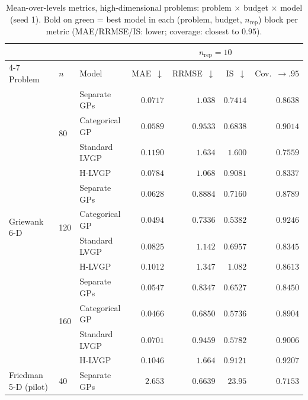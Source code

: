 \begin{table}[htbp]
\centering
\small
\setlength{\tabcolsep}{3.5pt}
\setlength{\fboxsep}{1.5pt}
\caption{Mean-over-levels metrics, high-dimensional problems: problem $\times$ budget $\times$ model (seed 1). Bold on green = best model in each (problem, budget, $n_{\mathrm{rep}}$) block per metric (MAE/RRMSE/IS: lower; coverage: closest to $0.95$).}
\label{tab:summary_hd}
\begin{tabular}{lllrrrr}
\toprule
 & & & \multicolumn{4}{c}{$n_{\mathrm{rep}}=10$} \\
\cmidrule(lr){4-7}
Problem & $n$ & Model & MAE~$\downarrow$ & RRMSE~$\downarrow$ & IS~$\downarrow$ & Cov.~$\to.95$ \\
\midrule
\multirow{12}{*}{Griewank 6-D} & \multirow{4}{*}{80} & Separate GPs & $0.0717$ & $1.038$ & $0.7414$ & $0.8638$ \\
 &  & Categorical GP & \colorbox{green!20}{\boldmath$0.0589$} & \colorbox{green!20}{\boldmath$0.9533$} & \colorbox{green!20}{\boldmath$0.6838$} & \colorbox{green!20}{\boldmath$0.9014$} \\
 &  & Standard LVGP & $0.1190$ & $1.634$ & $1.600$ & $0.7559$ \\
 &  & H-LVGP & $0.0784$ & $1.068$ & $0.9081$ & $0.8337$ \\
\cmidrule(lr){2-7}
 & \multirow{4}{*}{120} & Separate GPs & $0.0628$ & $0.8884$ & $0.7160$ & $0.8789$ \\
 &  & Categorical GP & \colorbox{green!20}{\boldmath$0.0494$} & \colorbox{green!20}{\boldmath$0.7336$} & \colorbox{green!20}{\boldmath$0.5382$} & \colorbox{green!20}{\boldmath$0.9246$} \\
 &  & Standard LVGP & $0.0825$ & $1.142$ & $0.6957$ & $0.8345$ \\
 &  & H-LVGP & $0.1012$ & $1.347$ & $1.082$ & $0.8613$ \\
\cmidrule(lr){2-7}
 & \multirow{4}{*}{160} & Separate GPs & $0.0547$ & $0.8347$ & $0.6527$ & $0.8450$ \\
 &  & Categorical GP & \colorbox{green!20}{\boldmath$0.0466$} & \colorbox{green!20}{\boldmath$0.6850$} & \colorbox{green!20}{\boldmath$0.5736$} & $0.8904$ \\
 &  & Standard LVGP & $0.0701$ & $0.9459$ & $0.5782$ & $0.9006$ \\
 &  & H-LVGP & $0.1046$ & $1.664$ & $0.9121$ & \colorbox{green!20}{\boldmath$0.9207$} \\
\midrule
\multirow{12}{*}{Friedman 5-D (pilot)} & \multirow{4}{*}{40} & Separate GPs & $2.653$ & $0.6639$ & $23.95$ & $0.7153$ \\

\end{tabular}
\end{table}
